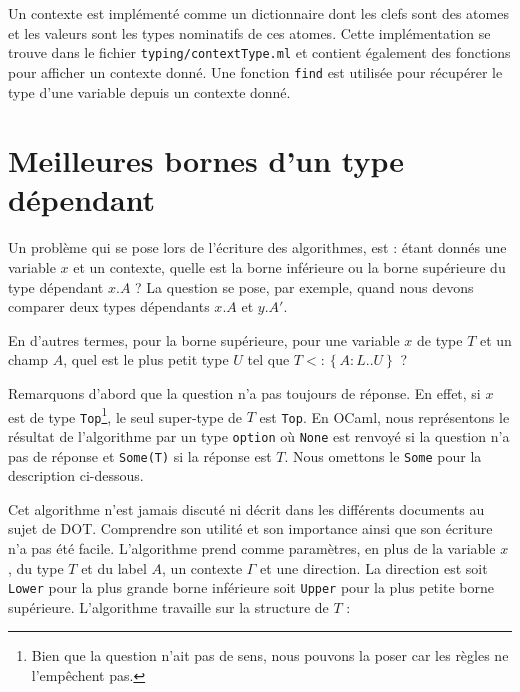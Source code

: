 Un contexte est implémenté comme un dictionnaire dont les clefs sont des atomes
et les valeurs sont les types nominatifs de ces atomes. Cette implémentation se
trouve dans le fichier \verb|typing/contextType.ml| et contient également
des fonctions pour afficher un contexte donné. Une fonction \verb|find| est utilisée
pour récupérer le type d'une variable depuis un contexte donné.

\section{Meilleures bornes d'un type dépendant}

Un problème qui se pose lors de l'écriture des algorithmes, est : étant donnés une variable
$x$ et un contexte, quelle est la borne inférieure ou la borne supérieure du
type dépendant $x.A$ ? La question se pose, par exemple, quand nous devons
comparer deux types dépendants $x.A$ et $y.A'$.

En d'autres termes, pour la borne supérieure, pour une variable $x$ de type $T$ et
un champ $A$, quel est le plus petit type $U$ tel que $T <: \left\{ A : L .. U
\right\}$ ?

Remarquons d'abord que la question n'a pas toujours de réponse. En effet, si $x$
est de type \verb|Top|\footnote{Bien que la question n'ait pas de sens, nous
  pouvons la poser car les règles ne l'empêchent pas.}, le seul super-type de
$T$ est \verb|Top|. En OCaml, nous représentons le résultat de l'algorithme par un
type \verb|option| où \verb|None| est renvoyé si la question n'a pas de réponse
et \verb|Some(T)| si la réponse est $T$. Nous omettons le \verb|Some| pour la
description ci-dessous.

Cet algorithme n'est jamais discuté ni décrit dans les différents
documents au sujet de DOT. Comprendre son utilité et son importance ainsi que
son écriture n'a pas été facile.
L'algorithme prend comme
paramètres, en plus de la variable $x$, du type $T$ et du label $A$, un contexte
$\Gamma$ et une direction. La direction est soit \verb|Lower| pour la
plus grande borne inférieure soit \verb|Upper| pour la plus petite borne
supérieure. L'algorithme travaille sur la structure de $T$ :

